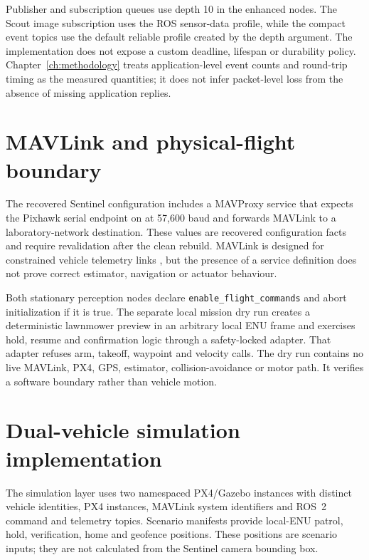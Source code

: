 Publisher and subscription queues use depth 10 in the enhanced nodes. The
Scout image subscription uses the ROS sensor-data profile, while the compact
event topics use the default reliable profile created by the depth argument.
The implementation does not expose a custom deadline, lifespan or durability
policy. Chapter~\ref{ch:methodology} treats application-level event counts and
round-trip timing as the measured quantities; it does not infer packet-level
loss from the absence of missing application replies.

\section{MAVLink and physical-flight boundary}
\label{sec:implementation:flight}

The recovered Sentinel configuration includes a MAVProxy service that expects
the Pixhawk serial endpoint on  at 57,600 baud and forwards
MAVLink to a laboratory-network destination. These values are recovered
configuration facts and require revalidation after the clean rebuild. MAVLink
is designed for constrained vehicle telemetry links \cite{MAVLinkProtocolOverview},
but the presence of a service definition does not prove correct estimator,
navigation or actuator behaviour.

Both stationary perception nodes declare \texttt{enable\_flight\_commands}
and abort initialization if it is true. The separate local mission dry run
creates a deterministic lawnmower preview in an arbitrary local ENU frame and
exercises hold, resume and confirmation logic through a safety-locked adapter.
That adapter refuses arm, takeoff, waypoint and velocity calls. The dry run
contains no live MAVLink, PX4, GPS, estimator, collision-avoidance or motor
path. It verifies a software boundary rather than vehicle motion.

\section{Dual-vehicle simulation implementation}
\label{sec:implementation:simulation}

The simulation layer uses two namespaced PX4/Gazebo instances with distinct
vehicle identities, PX4 instances, MAVLink system identifiers and ROS~2 command
and telemetry topics. Scenario manifests provide local-ENU patrol, hold,
verification, home and geofence positions. These positions are scenario inputs;
they are not calculated from the Sentinel camera bounding box.

